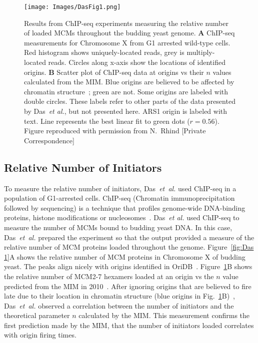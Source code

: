 {		\begin{figure}[tbh!]
			\begin{center}
				\texttt{[image: Images/DasFig1.png]}
			\end{center}
				\caption[Relative amounts of loaded MCM]{\label{fig:Das1} Results from ChIP-seq experiments measuring the relative number of loaded MCMs throughout the budding yeast genome.
					\textbf{A} ChIP-seq measurements for Chromosome X from G1 arrested wild-type cells.
					Red histogram shows uniquely-located reads, grey is multiply-located reads.
					Circles along x-axis show the locations of identified origins.
					\textbf{B} Scatter plot of ChIP-seq data at origins vs their $n$ values calculated from the MIM.
					Blue origins are believed to be affected by chromatin structure~\cite{Chromatin}; green are not.
					Some origins are labeled with double circles.
					These labels refer to other parts of the data presented by Das~\emph{et al.}, but not presented here.
					ARS1 origin is labeled with text.
					Line represents the best linear fit to green dots ($r=0.56$).
					Figure reproduced with permission from N.~Rhind [Private Correspondence]~\cite{Rhind}}
		\end{figure}
	
		\subsection{Relative Number of Initiators}
		\label{subsec:RelativeNo}
		
		To measure the relative number of initiators, Das~\emph{et~al.} used ChIP-seq in a population of G1-arrested cells.
		ChIP-seq (Chromatin immunoprecipitation followed by sequencing) is a technique that profiles genome-wide DNA-binding proteins, histone modifications or nucleosomes~\cite{ChIP-seq}.
		Das~\emph{et al.} used ChIP-seq to measure the number of MCMs bound to budding yeast DNA.
		In this case, Das~\emph{et~al.} prepared the experiment so that the output provided a measure of the relative number of MCM proteins loaded throughout the genome.
		Figure~\ref{fig:Das	1}A shows the relative number of MCM proteins in Chromosome X of budding yeast.
		The peaks align nicely with origins identified in OriDB~\cite{OriDB}.
		Figure~\ref{fig:Das1}B shows the relative number of MCM2-7 hexamers loaded at an origin vs the $n$ value predicted from the MIM in 2010~\cite{ScottsPaper}.
		After ignoring origins that are believed to fire late due to their location in chromatin structure (blue origins in Fig.~\ref{fig:Das1}B)~\cite{Chromatin}, Das~\emph{et~al.} observed a correlation between the number of initiators and the theoretical parameter $n$ calculated by the MIM.
		This measurement confirms the first prediction made by the MIM, that the number of initiators loaded correlates with origin firing times.
		
}
